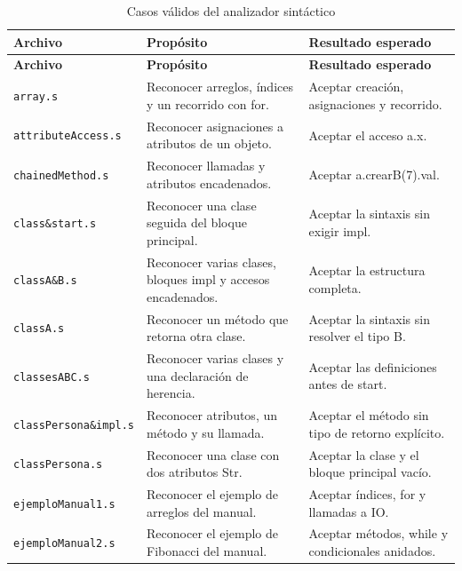\begingroup
\small
\renewcommand{\arraystretch}{1.2}
\setlength{\tabcolsep}{5pt}
\setlength{\LTleft}{0pt}
\setlength{\LTright}{0pt plus 1fill}
\begin{longtable}{|
>{\raggedright\arraybackslash}p{}|
>{\raggedright\arraybackslash}p{}|
>{\raggedright\arraybackslash}p{}|}
\caption{Casos válidos del analizador sintáctico}\label{tab:sintactico-validos}\\
\hline
\textbf{Archivo} & \textbf{Propósito} & \textbf{Resultado esperado} \\ \hline
\endfirsthead
\hline
\textbf{Archivo} & \textbf{Propósito} & \textbf{Resultado esperado} \\ \hline
\endhead
\texttt{array\allowbreak .s} & Reconocer arreglos, índices y un recorrido con for. & Aceptar creación, asignaciones y recorrido. \\ \hline
\texttt{attributeAccess\allowbreak .s} & Reconocer asignaciones a atributos de un objeto. & Aceptar el acceso a.x. \\ \hline
\texttt{chainedMethod\allowbreak .s} & Reconocer llamadas y atributos encadenados. & Aceptar a.crearB(7).val. \\ \hline
\texttt{class\&start\allowbreak .s} & Reconocer una clase seguida del bloque principal. & Aceptar la sintaxis sin exigir impl. \\ \hline
\texttt{classA\&B\allowbreak .s} & Reconocer varias clases, bloques impl y accesos encadenados. & Aceptar la estructura completa. \\ \hline
\texttt{classA\allowbreak .s} & Reconocer un método que retorna otra clase. & Aceptar la sintaxis sin resolver el tipo B. \\ \hline
\texttt{classesABC\allowbreak .s} & Reconocer varias clases y una declaración de herencia. & Aceptar las definiciones antes de start. \\ \hline
\texttt{classPersona\&impl\allowbreak .s} & Reconocer atributos, un método y su llamada. & Aceptar el método sin tipo de retorno explícito. \\ \hline
\texttt{classPersona\allowbreak .s} & Reconocer una clase con dos atributos Str. & Aceptar la clase y el bloque principal vacío. \\ \hline
\texttt{ejemploManual1\allowbreak .s} & Reconocer el ejemplo de arreglos del manual. & Aceptar índices, for y llamadas a IO. \\ \hline
\texttt{ejemploManual2\allowbreak .s} & Reconocer el ejemplo de Fibonacci del manual. & Aceptar métodos, while y condicionales anidados. \\ \hline

\end{longtable}
